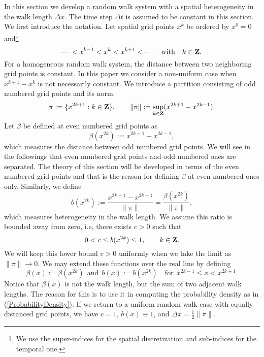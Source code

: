 \documentclass[11pt]{amsart}
\def\Z{{\bf Z}}
\begin{document}
In this section we develop a random walk system with a spatial heterogeneity in the walk length $\Delta x$. The time step $\Delta t$ is assumed to be constant in this section. We first introduce the notation. Let spatial grid points $x^k$ be ordered by $x^0=0$ and\footnote{We use the super-indices for the spatial discretization and sub-indices for the temporal one.}
\begin{equation}\label{x^k}
\cdots<x^{k-1}<x^k<x^{k+1}<\cdots \quad\text{with}\quad k\in\Z.
\end{equation}
For a homogeneous random walk system, the distance between two neighboring grid points is constant. In this paper we consider a non-uniform case when $x^{k+1}-x^{k}$ is not necessarily constant. We introduce a partition consisting of odd numbered grid points and its norm:
\begin{equation}\label{pi}
\pi:=\{x^{2k+1}:k\in\Z\},\qquad\|\pi\|:=\sup_{k\in\Z}(x^{2k+1}-x^{2k-1}).
\end{equation}
Let $\beta$ be defined at even numbered grid points as
\begin{equation}\label{betax2k}
\beta(x^{2k}):=x^{2k+1}-x^{2k-1},
\end{equation}
which measures the distance between odd numbered grid points. We will see in the followings that even numbered grid points and odd numbered ones are separated. The theory of this section will be developed in terms of the even numbered grid points and that is the reason for defining $\beta$ at even numbered ones only. Similarly, we define
\begin{equation}\label{bx2k}
b(x^{2k}):=\frac{x^{2k+1}-x^{2k-1}}{\|\pi\|}=\frac{\beta(x^{2k})}{\|\pi\|},
\end{equation}
which measures heterogeneity in the walk length. We assume this ratio is bounded away from zero, i.e, there exists $c>0$ such that
\begin{equation}\label{c}
0<c\le b(x^{2k})\le 1,\qquad k\in\Z.
\end{equation}
We will keep this lower bound $c>0$ uniformly when we take the limit as $\|\pi\|\to0$. We may extend these functions over the real line by defining
\begin{equation}\label{continuation}
\beta(x):=\beta(x^{2k})\ \
 \text{and}\ \ b(x):=b(x^{2k})\quad\text{for}\ \ x^{2k-1}\leq x<x^{2k+1}.
\end{equation}
Notice that $\beta(x)$ is not the walk length, but the sum of two adjacent walk lengths. The reason for this is to use it in computing the probability density as in (\ref{ProbabilityDensity}). If we return to a uniform random walk case with equally distanced grid points, we have $c=1$, $b(x)\equiv 1$, and $\Delta x =\frac{1}{2}\|\pi\|$.
\end{document}
